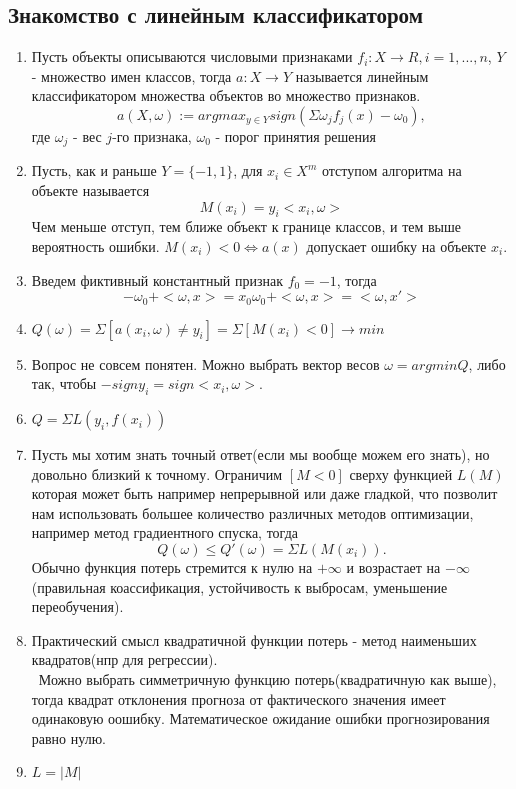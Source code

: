 \documentclass[12pt]{article}
\begin{document}
\subsection{Знакомство с линейным классификатором}
\begin{enumerate}
\item Пусть объекты описываются числовыми признаками $f_i:X\rightarrow R, i=1,...,n$, $Y$ - множество имен классов, тогда
$a:X\rightarrow Y$ называется линейным классификатором множества объектов во множество признаков.
$$a(X,\omega):=argmax_{y\in Y} sign(\Sigma \omega_j f_j(x)- \omega_0),$$
где $\omega_j$ - вес $j$-го признака, $\omega_0$ - порог принятия решения
\item Пусть, как и раньше $Y=\lbrace -1,1 \rbrace$, для $x_i\in X^m$ отступом алгоритма на объекте называется 
$$M(x_i)=y_i<x_i,\omega >$$
Чем меньше отступ, тем ближе объект к границе классов, и тем выше вероятность ошибки. $M(x_i)<0\Leftrightarrow a(x)$ допускает ошибку на объекте $x_i$.
\newpage
\item Введем фиктивный константный признак $f_0 = -1$, тогда
$$-\omega_0 + <\omega,x> = x_0\omega_0 + <\omega,x> = <\omega,x'>$$
\item $Q(\omega)=\Sigma[a(x_i,\omega)\neq y_i]=\Sigma[M(x_i)<0]\rightarrow min$
\item Вопрос не совсем понятен. Можно выбрать вектор весов $\omega=argminQ$, либо так, чтобы $-signy_i = sign<x_i,\omega>$.
\item $Q = \Sigma L(y_i,f(x_i))$
\item Пусть мы хотим знать точный ответ(если мы вообще можем его знать), но довольно близкий к точному. Ограничим $[M<0]$ сверху функцией $L(M)$  которая может быть например непрерывной или даже гладкой, что позволит нам использовать большее количество различных методов оптимизации, например метод градиентного спуска, тогда
$$Q(\omega)\leq Q'(\omega) = \Sigma L(M(x_i)).$$
Обычно функция потерь стремится к нулю на $+\infty$ и возрастает на $-\infty$ (правильная коассификация, устойчивость к выбросам, уменьшение переобучения).
\item Практический смысл квадратичной функции потерь - метод наименьших квадратов(нпр для регрессии).\\\
Можно выбрать симметричную функцию потерь(квадратичную как выше), тогда квадрат отклонения прогноза от фактического значения имеет одинаковую оошибку. Математическое ожидание ошибки прогнозирования равно нулю.
\item $L = |M|$\\\

\end{enumerate}
\end{document}

